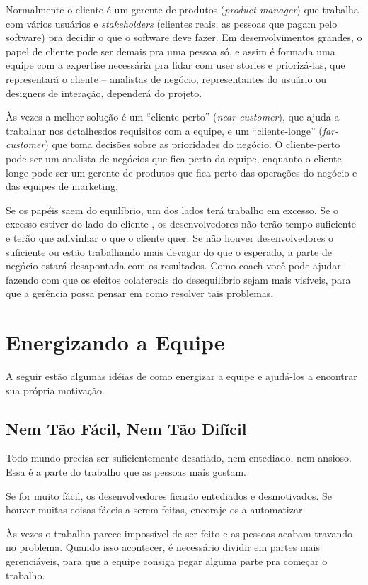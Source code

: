 \documentclass[a4paper, 10pt, font=plain]{abnt}
\begin{document}
Normalmente o cliente é um gerente de produtos (\textit{product manager}) que trabalha com vários usuários e \textit{stakeholders} (clientes reais, as pessoas que pagam pelo software) pra decidir o que o software deve fazer. Em desenvolvimentos grandes, o papel de cliente pode ser demais pra uma pessoa só, e assim é formada uma equipe com a expertise necessária pra lidar com user stories e priorizá-las, que representará o cliente -- analistas de negócio, representantes do usuário ou designers de interação, dependerá do projeto.

Às vezes a melhor solução é um ``cliente-perto'' (\textit{near-customer}), que ajuda a trabalhar nos detalhesdos requisitos com a equipe, e um ``cliente-longe'' (\textit{far-customer}) que toma decisões sobre as prioridades do negócio. O cliente-perto pode ser um analista de negócios que fica perto da equipe, enquanto o cliente-longe pode ser um gerente de produtos que fica perto das operações do negócio e das equipes de marketing.

Se os papéis saem do equilíbrio, um dos lados terá trabalho em excesso. Se o excesso estiver do lado do cliente , os desenvolvedores não terão tempo suficiente e terão que adivinhar o que o cliente quer. Se não houver desenvolvedores o suficiente ou estão trabalhando mais devagar do que o esperado, a parte de negócio estará desapontada com os resultados. Como coach você pode ajudar fazendo com que os efeitos colatereais do desequilíbrio sejam mais visíveis, para que a gerência possa pensar em como resolver tais problemas.



\section{Energizando a Equipe}
A seguir estão algumas idéias de como energizar a equipe e ajudá-los a encontrar sua própria motivação.


\subsection{Nem Tão Fácil, Nem Tão Difícil}
Todo mundo precisa ser suficientemente desafiado, nem entediado, nem ansioso. Essa é a parte do trabalho que as pessoas mais gostam.

Se for muito fácil, os desenvolvedores ficarão entediados e desmotivados. Se houver muitas coisas fáceis a serem feitas, encoraje-os a automatizar.

Às vezes o trabalho parece impossível de ser feito e as pessoas acabam travando no problema. Quando isso acontecer, é necessário dividir em partes mais gerenciáveis, para que a equipe consiga pegar alguma parte pra começar o trabalho.
\end{document}
